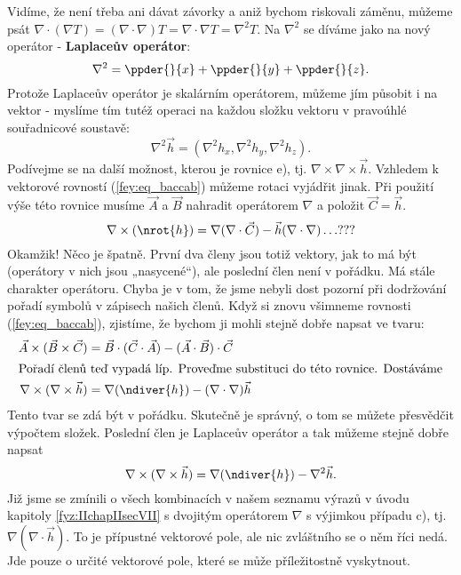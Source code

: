     Vidíme, že není třeba ani dávat závorky a aniž bychom riskovali záměnu, můžeme psát \(\nabla 
    \cdot(\nabla T) = (\nabla\cdot\nabla)T = \nabla\cdot\nabla T = \nabla^2T\). Na \(\nabla^2\) se 
    díváme jako na nový operátor - \textbf{Laplaceův operátor}:
    \begin{equation}\label{fyz:eq687}
      \nabla^2 = \ppder{}{x} + \ppder{}{y} + \ppder{}{z}.
    \end{equation}
    Protože Laplaceův operátor je skalárním operátorem, můžeme jím působit i na vektor - myslíme 
    tím tutéž operaci na každou složku vektoru v pravoúhlé souřadnicové soustavě:
    \begin{equation*}
      \nabla^2\vec{h} = (\nabla^2h_x, \nabla^2h_y, \nabla^2h_z).
    \end{equation*}
    Podívejme se na další možnost, kterou je rovnice e), tj. \(\nabla\times\nabla\times\vec{h}\). 
    Vzhledem k vektorové rovností (\ref{fey:eq_baccab}) můžeme rotaci vyjádřit jinak. Při použití 
    výše této rovnice 
    musíme \(\vec{A}\) a \(\vec{B}\) nahradit operátorem \(\nabla\) a položit \(\vec{C} = \vec{h}\).
    \begin{equation*}
      \nabla\times(\nrot{h}) = \nabla(\nabla\cdot\vec{C}) - \vec{h}(\nabla\cdot\nabla) \ldots ???
    \end{equation*}
    Okamžik! Něco je špatně. První dva členy jsou totiž vektory, jak to má být (operátory v nich 
    jsou „nasycené“), ale poslední člen není v pořádku. Má stále charakter operátoru. Chyba je v 
    tom, že jsme nebyli dost pozorní při dodržování pořadí symbolů v zápisech našich členů. Když si 
    znovu všimneme rovnosti (\ref{fey:eq_baccab}), zjistíme, že bychom ji mohli stejně dobře napsat 
    ve tvaru:
    \begin{align*}
      \vec{A}\times(\vec{B}\times\vec{C}) 
        &= \vec{B}\cdot(\vec{C}\cdot\vec{A}) - (\vec{A}\cdot\vec{B})\cdot\vec{C}  \\
      \shortintertext{Pořadí členů teď vypadá líp. Proveďme substituci do této rovnice. Dostáváme} 
      \nabla\times(\nabla\times\vec{h})
        &= \nabla(\ndiver{h}) - (\nabla\cdot\nabla)\vec{h} 
    \end{align*}
    Tento tvar se zdá být v pořádku. Skutečně je správný, o tom se můžete přesvědčit výpočtem 
    složek. Poslední člen je Laplaceův operátor a tak můžeme stejně dobře napsat
    \begin{equation*}
      \nabla\times(\nabla\times\vec{h}) = \nabla(\ndiver{h}) - \nabla^2\vec{h}.
    \end{equation*}
    Již jsme se zmínili o všech kombinacích v našem seznamu výrazů v úvodu kapitoly  
    \ref{fyz:IIchapIIsecVII} s dvojitým operátorem \(\nabla\) s výjimkou případu c), 
    tj.\(\nabla(\nabla\cdot\vec{h})\). To je přípustné vektorové pole, ale nic zvláštního se o něm 
    říci nedá. Jde pouze o určité vektorové pole, které se může příležitostně vyskytnout.

